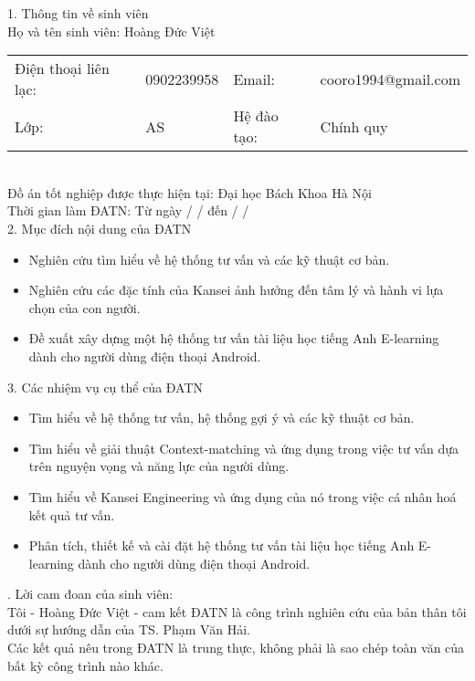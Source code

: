  
 
\begin{acknowledgementslong}      
1. Thông tin về sinh viên\\
Họ và tên sinh viên: Hoàng Đức Việt\\
\begin{tabular}{@{}l l l l}
Điện thoại liên lạc: & 0902239958 & Email: & cooro1994@gmail.com \\ 
Lớp: &AS & Hệ đào tạo:  & Chính quy
\end{tabular}\\
Đồ án tốt nghiệp được thực hiện tại: Đại học Bách Khoa Hà Nội\\
Thời gian làm ĐATN: Từ ngày  \textbf{  } /\textbf{  } /\textbf{    }          đến \textbf{  } /\textbf{  } /\textbf{    }\\[0.5cm]
2. Mục đích nội dung của ĐATN 
\begin{itemize}
\item Nghiên cứu tìm hiểu về hệ thống tư vấn và các kỹ thuật cơ bản.  
\item Nghiên cứu các đặc tính của Kansei ảnh hưởng đến tâm lý và hành vi lựa chọn của con người.
\item Đề xuất xây dựng một hệ thống tư vấn tài liệu học tiếng Anh E-learning dành cho người dùng điện thoại Android.\\
\end{itemize}

3. Các nhiệm vụ cụ thể của ĐATN 
\begin{itemize}
\item Tìm hiểu về hệ thống tư vấn, hệ thống gợi ý và các kỹ thuật cơ bản.
\item Tìm hiểu về giải thuật Context-matching và ứng dụng trong việc tư vấn dựa trên nguyện vọng và năng lực của người dùng.
\item Tìm hiểu về Kansei Engineering và ứng dụng của nó trong việc cá nhân hoá kết quả tư vấn.
\item Phân tích, thiết kế và cài đặt hệ thống tư vấn tài liệu học tiếng Anh E-learning dành cho người dùng điện thoại Android.
\end{itemize}
. Lời cam đoan của sinh viên:\\
Tôi - Hoàng Đức Việt - cam kết ĐATN là công trình nghiên cứu của bản thân tôi dưới sự hướng dẫn của TS. Phạm Văn Hải. \\
Các kết quả nêu trong ĐATN là trung thực, không phải là sao chép toàn văn của bất kỳ công trình nào khác.\\


\end{acknowledgementslong}
